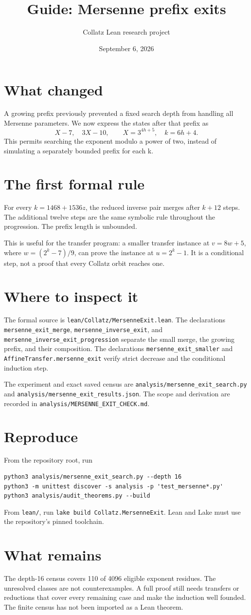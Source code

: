 \documentclass[10pt]{article}
\title{Guide: Mersenne prefix exits}
\author{Collatz Lean research project}
\date{September 6, 2026}
\begin{document}
\maketitle
\section*{What changed}
A growing prefix previously prevented a fixed search depth from handling all Mersenne parameters. We now express the states after that prefix as
\[
 X-7,\quad 3X-10,\qquad X=3^{4h+5},\quad k=6h+4.
\]
This permits searching the exponent modulo a power of two, instead of simulating a separately bounded prefix for each k.
\section*{The first formal rule}
For every $k=1468+1536z$, the reduced inverse pair merges after $k+12$ steps. The additional twelve steps are the same symbolic rule throughout the progression. The prefix length is unbounded.

This is useful for the transfer program: a smaller transfer instance at
$v=8w+5$, where $w=(2^k-7)/9$, can prove the instance at $u=2^k-1$.
It is a conditional step, not a proof that every Collatz orbit reaches one.
\section*{Where to inspect it}
\raggedright
The formal source is \texttt{lean/Collatz/MersenneExit.lean}.
The declarations \texttt{mersenne\_exit\_merge},
\texttt{mersenne\_inverse\_exit}, and
\texttt{mersenne\_inverse\_exit\_progression} separate the small merge,
the growing prefix, and their composition.
The declarations \texttt{mersenne\_exit\_smaller} and
\texttt{AffineTransfer.mersenne\_exit} verify strict decrease and the conditional induction step.

The experiment and exact saved census are
\texttt{analysis/mersenne\_exit\_search.py} and
\texttt{analysis/mersenne\_exit\_results.json}.
The scope and derivation are recorded in
\texttt{analysis/MERSENNE\_EXIT\_CHECK.md}.
\section*{Reproduce}
From the repository root, run
\begin{verbatim}
python3 analysis/mersenne_exit_search.py --depth 16
python3 -m unittest discover -s analysis -p 'test_mersenne*.py'
python3 analysis/audit_theorems.py --build
\end{verbatim}
From \texttt{lean/}, run \texttt{lake build Collatz.MersenneExit}.
Lean and Lake must use the repository's pinned toolchain.
\section*{What remains}
The depth-16 census covers 110 of 4096 eligible exponent residues. The unresolved classes are not counterexamples. A full proof still needs transfers or reductions that cover every remaining case and make the induction well founded. The finite census has not been imported as a Lean theorem.
\end{document}
